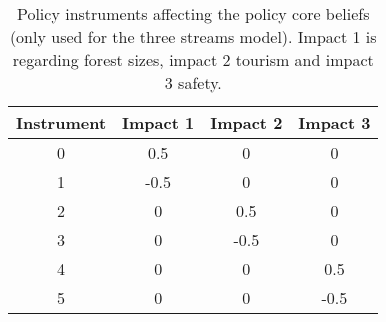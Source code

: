 \begin{table}
\begin{center}
\caption{Policy instruments affecting the policy core beliefs (only used for the three streams model). Impact 1 is regarding forest sizes, impact 2 tourism and impact 3 safety.}
\begin{tabular}{| c | c | c | c |} \hline
{\bfseries Instrument}
		& {\bfseries Impact 1}
				& {\bfseries Impact 2} 
						& {\bfseries Impact 3}
								\\ \hline
0 		& 0.5	& 0		& 0		\\ \hline
1 		& -0.5	& 0		& 0		\\ \hline
2		& 0		& 0.5	& 0		\\ \hline
3 		& 0		& -0.5	& 0		\\ \hline
4		& 0		& 0		& 0.5	\\ \hline
5 		& 0		& 0		& -0.5	\\ \hline


\end{tabular}
\label{tab:policies}
\end{center}
\end{table}
